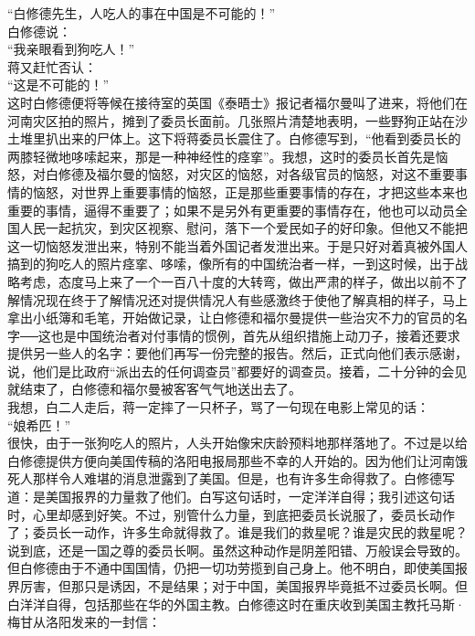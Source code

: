 “白修德先生，人吃人的事在中国是不可能的！”\\

白修德说：\\

“我亲眼看到狗吃人！”\\

蒋又赶忙否认：\\

“这是不可能的！”\\

这时白修德便将等候在接待室的英国《泰晤士》报记者福尔曼叫了进来，将他们在河南灾区拍的照片，摊到了委员长面前。几张照片清楚地表明，一些野狗正站在沙土堆里扒出来的尸体上。这下将蒋委员长震住了。白修德写到，“他看到委员长的两膝轻微地哆嗦起来，那是一种神经性的痉挛”。我想，这时的委员长首先是恼怒，对白修德及福尔曼的恼怒，对灾区的恼怒，对各级官员的恼怒，对这不重要事情的恼怒，对世界上重要事情的恼怒，正是那些重要事情的存在，才把这些本来也重要的事情，逼得不重要了；如果不是另外有更重要的事情存在，他也可以动员全国人民一起抗灾，到灾区视察、慰问，落下一个爱民如子的好印象。但他又不能把这一切恼怒发泄出来，特别不能当着外国记者发泄出来。于是只好对着真被外国人搞到的狗吃人的照片痉挛、哆嗦，像所有的中国统治者一样，一到这时候，出于战略考虑，态度马上来了一个一百八十度的大转弯，做出严肃的样子，做出以前不了解情况现在终于了解情况还对提供情况人有些感激终于使他了解真相的样子，马上拿出小纸簿和毛笔，开始做记录，让白修德和福尔曼提供一些治灾不力的官员的名字──这也是中国统治者对付事情的惯例，首先从组织措施上动刀子，接着还要求提供另一些人的名字：要他们再写一份完整的报告。然后，正式向他们表示感谢，说，他们是比政府“派出去的任何调查员”都要好的调查员。接着，二十分钟的会见就结束了，白修德和福尔曼被客客气气地送出去了。\\

我想，白二人走后，蒋一定摔了一只杯子，骂了一句现在电影上常见的话：\\

“娘希匹！”\\

很快，由于一张狗吃人的照片，人头开始像宋庆龄预料地那样落地了。不过是以给白修德提供方便向美国传稿的洛阳电报局那些不幸的人开始的。因为他们让河南饿死人那样令人难堪的消息泄露到了美国。但是，也有许多生命得救了。白修德写道：是美国报界的力量救了他们。白写这句话时，一定洋洋自得；我引述这句话时，心里却感到好笑。不过，别管什么力量，到底把委员长说服了，委员长动作了；委员长一动作，许多生命就得救了。谁是我们的救星呢？谁是灾民的救星呢？说到底，还是一国之尊的委员长啊。虽然这种动作是阴差阳错、万般误会导致的。但白修德由于不通中国国情，仍把一切功劳揽到自己身上。他不明白，即使美国报界厉害，但那只是诱因，不是结果；对于中国，美国报界毕竟抵不过委员长啊。但白洋洋自得，包括那些在华的外国主教。白修德这时在重庆收到美国主教托马斯·梅甘从洛阳发来的一封信：\\

